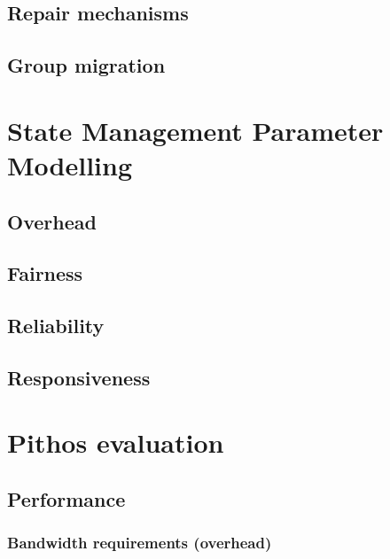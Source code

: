     \section{Repair mechanisms}

    \section{Group migration}

\chapter{State Management Parameter Modelling}
\label{chp:MODELLING}

    \section{Overhead}
    \section{Fairness}
    \section{Reliability}
    \section{Responsiveness}

    \chapter{Pithos evaluation}
    \label{chp:EVALUATION}

    \section{Performance}

    \subsection{Bandwidth requirements (overhead)}

